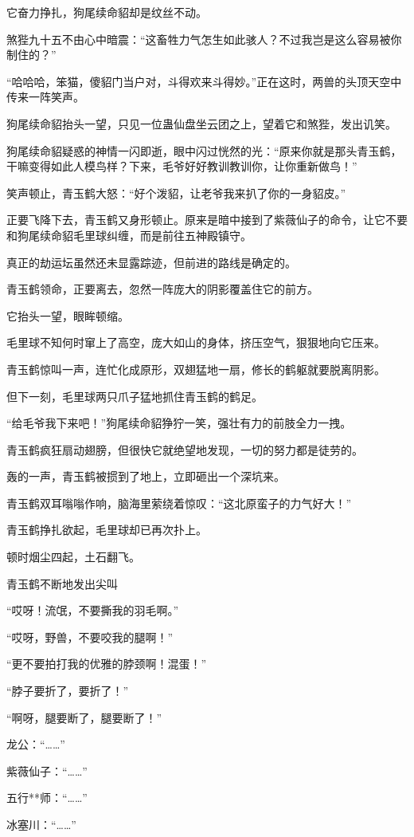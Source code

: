 \begin{this_body}
它奋力挣扎，狗尾续命貂却是纹丝不动。

煞狴九十五不由心中暗震：“这畜牲力气怎生如此骇人？不过我岂是这么容易被你制住的？”

“哈哈哈，笨猫，傻貂门当户对，斗得欢来斗得妙。”正在这时，两兽的头顶天空中传来一阵笑声。

狗尾续命貂抬头一望，只见一位蛊仙盘坐云团之上，望着它和煞狴，发出讥笑。

狗尾续命貂疑惑的神情一闪即逝，眼中闪过恍然的光：“原来你就是那头青玉鹤，干嘛变得如此人模鸟样？下来，毛爷好好教训教训你，让你重新做鸟！”

笑声顿止，青玉鹤大怒：“好个泼貂，让老爷我来扒了你的一身貂皮。”

正要飞降下去，青玉鹤又身形顿止。原来是暗中接到了紫薇仙子的命令，让它不要和狗尾续命貂毛里球纠缠，而是前往五神殿镇守。

真正的劫运坛虽然还未显露踪迹，但前进的路线是确定的。

青玉鹤领命，正要离去，忽然一阵庞大的阴影覆盖住它的前方。

它抬头一望，眼眸顿缩。

毛里球不知何时窜上了高空，庞大如山的身体，挤压空气，狠狠地向它压来。

青玉鹤惊叫一声，连忙化成原形，双翅猛地一扇，修长的鹤躯就要脱离阴影。

但下一刻，毛里球两只爪子猛地抓住青玉鹤的鹤足。

“给毛爷我下来吧！”狗尾续命貂狰狞一笑，强壮有力的前肢全力一拽。

青玉鹤疯狂扇动翅膀，但很快它就绝望地发现，一切的努力都是徒劳的。

轰的一声，青玉鹤被掼到了地上，立即砸出一个深坑来。

青玉鹤双耳嗡嗡作响，脑海里萦绕着惊叹：“这北原蛮子的力气好大！”

青玉鹤挣扎欲起，毛里球却已再次扑上。

顿时烟尘四起，土石翻飞。

青玉鹤不断地发出尖叫

“哎呀！流氓，不要撕我的羽毛啊。”

“哎呀，野兽，不要咬我的腿啊！”

“更不要拍打我的优雅的脖颈啊！混蛋！”

“脖子要折了，要折了！”

“啊呀，腿要断了，腿要断了！”

龙公：“……”

紫薇仙子：“……”

五行**师：“……”

冰塞川：“……”


\end{this_body}

